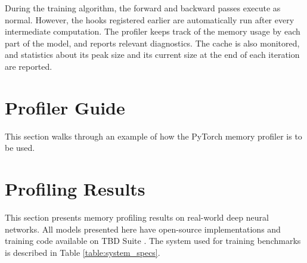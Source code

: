\documentclass[12pt,letterpaper]{article}
\begin{document}
During the training algorithm, the forward and backward passes execute as normal. However, the hooks registered earlier are automatically run after every intermediate computation. The profiler keeps track of the memory usage by each part of the model, and reports relevant diagnostics. The cache is also monitored, and statistics about its peak size and its current size at the end of each iteration are reported. \par 

\section{Profiler Guide}
\label{profiler_guide}
This section walks through an example of how the PyTorch memory profiler is to be used.




%
%
\section{Profiling Results}
\label{profiling_results}
This section presents memory profiling results on real-world deep neural networks. All models presented here have open-source implementations and training code available on TBD Suite \cite{tbd_suite}. The system used for training benchmarks is described in Table \ref{table:system_specs}.

\begin{table}[H]
\centering
{}
\caption{Specification of system used for profiling}
\label{table:system_specs}
\end{table}
\end{document}
